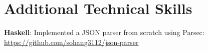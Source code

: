 \documentclass[letterpaper,11pt]{article}
\begin{document}
\section{Additional Technical Skills}
 \begin{itemize}[leftmargin=0.15in, label={}]
    \small{\item{
     \textbf{Haskell}: Implemented a JSON \textsf{parser} from scratch using \textsf{Parsec}: \url{https://github.com/sohang3112/json-parser} \\

     \iffalse
     \textbf{Rust}{: Completed Rustlings (practice exercises for Rust), Solving Macrokata exercises.} \\
     \textbf{NodeJS/ExpressJS}{: Familiar with creating basic servers using NodeJS and ExpressJS} \\
     \textbf{Clojure}{: Solved HackerRank problems.} \\
     \fi
    }}
 \end{itemize}

\end{document}
